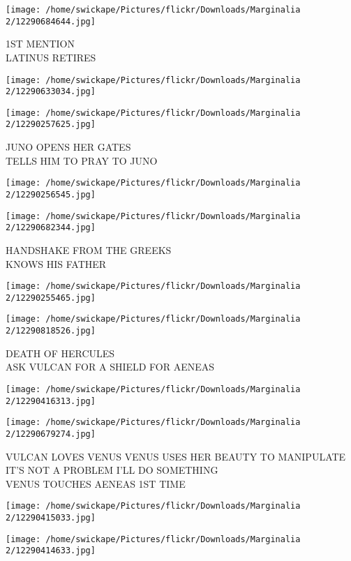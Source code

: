 \documentclass[10pt,letterpaper]{article}
\begin{document}
\vspace{0.25in}
\texttt{[image: /home/swickape/Pictures/flickr/Downloads/Marginalia 2/12290684644.jpg]}

1ST MENTION\\
LATINUS RETIRES
\pagebreak

\texttt{[image: /home/swickape/Pictures/flickr/Downloads/Marginalia 2/12290633034.jpg]}

\vspace{0.25in}
\texttt{[image: /home/swickape/Pictures/flickr/Downloads/Marginalia 2/12290257625.jpg]}

JUNO OPENS HER GATES\\
TELLS HIM TO PRAY TO JUNO
\pagebreak

\texttt{[image: /home/swickape/Pictures/flickr/Downloads/Marginalia 2/12290256545.jpg]}

\vspace{0.25in}
\texttt{[image: /home/swickape/Pictures/flickr/Downloads/Marginalia 2/12290682344.jpg]}

HANDSHAKE FROM THE GREEKS\\
KNOWS HIS FATHER
\pagebreak

\texttt{[image: /home/swickape/Pictures/flickr/Downloads/Marginalia 2/12290255465.jpg]}

\vspace{0.25in}
\texttt{[image: /home/swickape/Pictures/flickr/Downloads/Marginalia 2/12290818526.jpg]}

DEATH OF HERCULES\\
ASK VULCAN FOR A SHIELD FOR AENEAS
\pagebreak

\texttt{[image: /home/swickape/Pictures/flickr/Downloads/Marginalia 2/12290416313.jpg]}

\vspace{0.25in}
\texttt{[image: /home/swickape/Pictures/flickr/Downloads/Marginalia 2/12290679274.jpg]}

VULCAN LOVES VENUS VENUS USES HER BEAUTY TO MANIPULATE IT'S NOT A PROBLEM I'LL DO SOMETHING\\
VENUS TOUCHES AENEAS 1ST TIME
\pagebreak

\texttt{[image: /home/swickape/Pictures/flickr/Downloads/Marginalia 2/12290415033.jpg]}

\vspace{0.25in}
\texttt{[image: /home/swickape/Pictures/flickr/Downloads/Marginalia 2/12290414633.jpg]}
\end{document}
